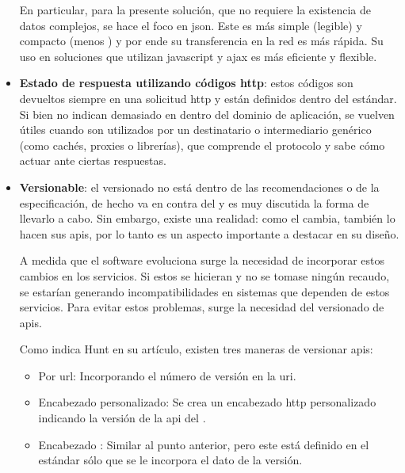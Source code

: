 \begin{itemize}
En particular, para la presente solución, que no requiere la existencia de datos complejos, se hace el foco en \gls{json}. Este es más simple (legible) y compacto (menos ) y por ende su transferencia en la red es más rápida. Su uso en soluciones que utilizan \gls{javascript} y \gls{ajax} es más eficiente y flexible\cite{maeda2012performance}.

\item \textbf{Estado de respuesta utilizando códigos  \gls{http}}: estos códigos son devueltos siempre en una solicitud \gls{http} y están definidos dentro del estándar\cite{fielding2014hypertext}. Si bien no indican demasiado en dentro del dominio de aplicación, se vuelven útiles cuando son utilizados por un destinatario o intermediario genérico (como cachés, proxies o librerías), que comprende el protocolo y sabe cómo actuar ante ciertas respuestas.

\item \textbf{Versionable}: el versionado no está dentro de las recomendaciones o de la especificación, de hecho va en contra del  y es muy discutida la forma de llevarlo a cabo. Sin embargo, existe una realidad: como el  cambia, también lo hacen sus \glspl{api}, por lo tanto es un aspecto importante a destacar en su diseño. 

A medida que el software evoluciona surge la necesidad de incorporar estos cambios en los servicios. Si estos se hicieran y no se tomase ningún recaudo, se estarían generando incompatibilidades en sistemas que dependen de estos servicios. Para evitar estos problemas, surge la necesidad del versionado de \glspl{api}.

Como indica Hunt en su artículo\cite{ApiVersion}, existen tres maneras  de versionar \glspl{api}:
\begin{itemize}
\item Por \gls{url}: Incorporando el número de versión en la \gls{uri}.
\item Encabezado personalizado: Se crea un encabezado \gls{http} personalizado indicando la versión de la \gls{api} del .
\item Encabezado : Similar al punto anterior, pero este está definido en el estándar sólo que se le incorpora el dato de la versión.
\end{itemize}


\end{itemize}


